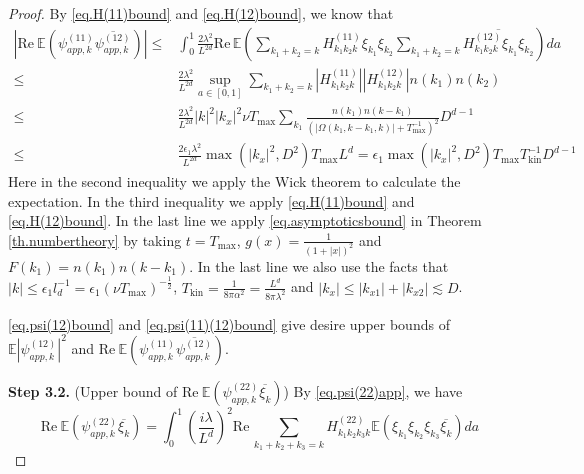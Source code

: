 \begin{proof}
By \eqref{eq.H(11)bound} and \eqref{eq.H(12)bound}, we know that 
\begin{equation}\label{eq.psi(11)(12)bound}
\begin{split}
    \left|\text{Re}\ \mathbb E \left(\psi^{(11)}_{app,k}\overline{\psi^{(12)}_{app,k}}\right)\right|
    \le& \int^1_{0}\frac{2\lambda^2}{L^{2d}} \text{Re}\,\mathbb E\left(\sum\limits_{k_1+k_2=k} H^{(11)}_{k_1k_2k}\xi_{k_1} \xi_{k_2}  \sum\limits_{k_1+k_2=k} \overline{H^{(12)}_{k_1k_2k}\xi_{k_1} \xi_{k_2}}\right) da 
    \\
    \le& \frac{2\lambda^2}{L^{2d}} \sup_{a\in[0,1]}\sum\limits_{k_1+k_2=k} \left|H^{(11)}_{k_1k_2k}\right|\left|H^{(12)}_{k_1k_2k}\right|n(k_1) n(k_2)
    \\
    \le& \frac{2\lambda^2}{L^{2d}} |k|^2|k_x|^2\nu T_{\text{max}} \sum\limits_{k_1} \frac{n(k_1) n(k-k_1)}{(|\Omega(k_1,k-k_1,k)|+T^{-1}_{\text{max}})^2}D^{d-1}
    \\
    \le& \frac{2\epsilon_1\lambda^2}{L^{2d}} \max(|k_x|^2,D^2) T_{\text{max}} L^d=\epsilon_1 \max(|k_x|^2,D^2) T_{\text{max}} T^{-1}_{\text{kin}} D^{d-1}
\end{split}   
\end{equation}
Here in the second inequality we apply the Wick theorem to calculate the expectation. In the third inequality we apply \eqref{eq.H(11)bound} and \eqref{eq.H(12)bound}. In the last line we apply \eqref{eq.asymptoticsbound} in Theorem \ref{th.numbertheory} by taking $t=T_{\text{max}}$, $g(x)=\frac{1}{(1+|x|)^2}$ and $F(k_1)=n(k_1) n(k-k_1)$. In the last line we also use the facts that $|k|\le \epsilon_1 l_{d}^{-1}=\epsilon_1 (\nu T_{\text{max}})^{-\frac{1}{2}}$, $T_{\text{kin}}=\frac{1}{8\pi\alpha^2}=\frac{L^{d}}{8\pi\lambda^2}$ and $|k_x|\le |k_{x1}|+|k_{x2}|\lesssim D$.

\eqref{eq.psi(12)bound} and \eqref{eq.psi(11)(12)bound} give desire upper bounds of $\mathbb E \left|\psi^{(12)}_{app,k}\right|^2$ and $\text{Re}\ \mathbb E \left(\psi^{(11)}_{app,k}\overline{\psi^{(12)}_{app,k}}\right)$.




\textbf{Step 3.2.} (Upper bound of $\text{Re}\  \mathbb E \left(\psi^{(22)}_{app,k}\overline{\xi_k}\right)$) By \eqref{eq.psi(22)app}, we have 
\begin{equation}
\text{Re}\  \mathbb E \left(\psi^{(22)}_{app,k}\overline{\xi_k}\right)=\int^1_{0}\left(\frac{i\lambda}{L^{d}}\right)^2 \text{Re}\,\sum\limits_{k_1+k_2+k_3=k} H^{(22)}_{k_1k_2k_3k}\mathbb E\left(\xi_{k_1} \xi_{k_2}\xi_{k_3}\overline{\xi_k}\right) da 
\end{equation}


\end{proof}
